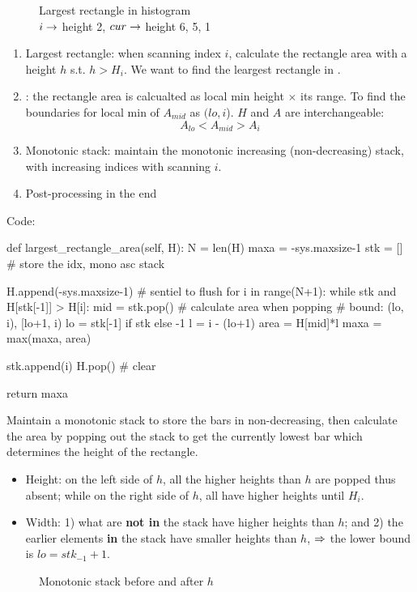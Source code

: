 \begin{figure}[]
\centering
{}
\caption{Largest rectangle in histogram\\ $i \rightarrow$ height 2, $cur \rightarrow$ height 6, 5, 1}
\label{fig:histogram_area}
\end{figure}

\begin{enumerate}
\item Largest rectangle: when scanning index $i$, calculate the rectangle area with a height $h$ s.t. $h > H_i$. We want to find the leargest rectangle in . 
\item {}: the rectangle area is calcualted as local min height $\times$ its range. To find the boundaries for local min of $A_{mid}$ as $(lo, i$). $H$ and $A$ are interchangeable:
$$
A_{lo} < A_{mid} > A_{i}
$$
\item Monotonic stack: maintain the monotonic increasing (non-decreasing) stack, with increasing indices with scanning $i$. 
\item Post-processing in the end
\end{enumerate}

Code:
\begin{python}
def largest_rectangle_area(self, H):
    N = len(H)
    maxa = -sys.maxsize-1
    stk = []  # store the idx, mono asc stack
	
    H.append(-sys.maxsize-1)  # sentiel to flush
    for i in range(N+1):
        while stk and H[stk[-1]] > H[i]:
            mid = stk.pop()
            # calculate area when popping
            # bound: (lo, i), [lo+1, i)
            lo = stk[-1] if stk else -1
            l = i - (lo+1)
            area = H[mid]*l
            maxa = max(maxa, area)

        stk.append(i)
    H.pop()  # clear

    return maxa
\end{python}
Maintain a monotonic stack to store the bars in non-decreasing, then calculate the area by popping out the stack to get the currently lowest bar which determines the height of the rectangle.
\begin{itemize}
\item Height: on the left side of $h$, all the higher heights than $h$ are popped thus absent; while on the right side of $h$, all have higher heights until $H_i$. 
\item Width: 1) what are \textbf{not in} the stack have higher heights than $h$; and 2) the earlier elements \textbf{in} the stack have smaller heights than $h$, $\Rightarrow$ the lower bound is $lo = stk_{-1}+1$.
\end{itemize}
\begin{figure}[]
\centering
{}
\caption{Monotonic stack before and after $h$}
\label{fig:monotonic_stk}
\end{figure}

